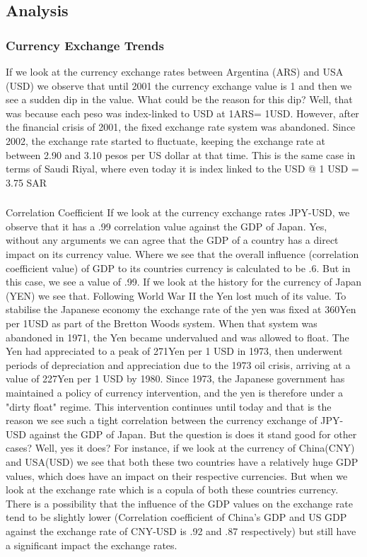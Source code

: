 \subsection{Analysis}
\subsubsection{Currency Exchange Trends}
If we look at the currency exchange rates between Argentina (ARS) and USA (USD) we observe that until 2001 the currency exchange value is 1 and then we see a sudden dip in the value. What could be the reason for this dip? Well, that was because each peso was index-linked to USD at 1ARS= 1USD. However, after the financial crisis of 2001, the fixed exchange rate system was abandoned. Since 2002, the exchange rate started to fluctuate, keeping the exchange rate at between 2.90 and 3.10 pesos per US dollar at that time.  
This is the same case in terms of Saudi Riyal, where even today it is index linked to the USD @ 1 USD = 3.75 SAR 
\subsubsection{}{Correlation Coefficient}
If we look at the currency exchange rates JPY-USD, we observe that it has a .99 correlation value against the GDP of Japan. Yes, without any arguments we can agree that the GDP of a country has a direct impact on its currency value. Where we see that the overall influence (correlation coefficient value) of GDP to its countries currency is calculated to be .6. But in this case, we see a value of .99.
\newline
If we look at the history for the currency of Japan (YEN) we see that. Following World War II the Yen lost much of its value. To stabilise the Japanese economy the exchange rate of the yen was fixed at 360Yen per 1USD as part of the Bretton Woods system. When that system was abandoned in 1971, the Yen became undervalued and was allowed to float. The Yen had appreciated to a peak of 271Yen per 1 USD in 1973, then underwent periods of depreciation and appreciation due to the 1973 oil crisis, arriving at a value of 227Yen per 1 USD by 1980. Since 1973, the Japanese government has maintained a policy of currency intervention, and the yen is therefore under a "dirty float" regime. This intervention continues until today and that is the reason we see such a tight correlation between the currency exchange of JPY-USD against the GDP of Japan.\newline
But the question is does it stand good for other cases? Well, yes it does? For instance, if we look at the currency of China(CNY) and USA(USD) we see that both these two countries have a relatively huge GDP values, which does have an impact on their respective currencies. But when we look at the exchange rate which is a copula of both these countries currency. There is a possibility that the influence of the GDP values on the exchange rate tend to be slightly lower (Correlation coefficient of China's GDP and US GDP against the exchange rate of CNY-USD is .92 and .87 respectively) but still have a significant impact the exchange rates. 

